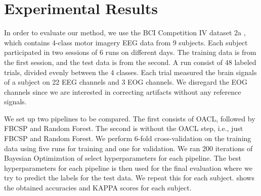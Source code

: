 \section{Experimental Results}
In order to evaluate our method, we use the BCI Competition IV dataset 2a \citep{brunner2008bci}, which contains 4-class motor imagery EEG data from 9 subjects. Each subject participated in two sessions of 6 runs on different days. The training data is from the first session, and the test data is from the second. A run consist of 48 labeled trials, divided evenly between the 4 classes. Each trial measured the brain signals of a subject on 22 EEG channels and 3 EOG channels. We disregard the EOG channels since we are interested in correcting artifacts without any reference signals.

We set up two pipelines to be compared. The first consists of OACL, followed by FBCSP and Random Forest. The second is without the OACL step, i.e., just FBCSP and Random Forest. We perform 6-fold cross-validation on the training data using five runs for training and one for validation. We ran 200 iterations of Bayesian Optimization of select hyperparameters for each pipeline. The best hyperparameters for each pipeline is then used for the final evaluation where we try to predict the labels for the test data. We repeat this for each subject.  shows the obtained accuracies and KAPPA scores for each subject.

